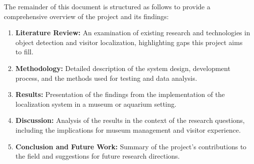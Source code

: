 The remainder of this document is structured as follows to provide a comprehensive overview of the project and its findings:
\begin{enumerate}
    \item \textbf{Literature Review:} An examination of existing research and technologies in object detection and visitor localization, highlighting gaps this project aims to fill.
    \item \textbf{Methodology:} Detailed description of the system design, development process, and the methods used for testing and data analysis.
    \item \textbf{Results:} Presentation of the findings from the implementation of the localization system in a museum or aquarium setting.
    \item \textbf{Discussion:} Analysis of the results in the context of the research questions, including the implications for museum management and visitor experience.
    \item \textbf{Conclusion and Future Work:} Summary of the project's contributions to the field and suggestions for future research directions.
\end{enumerate}

